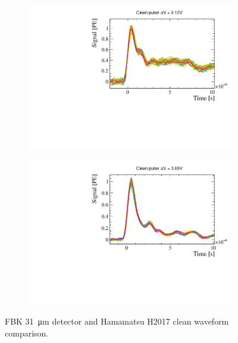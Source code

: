\begin{figure}[htbp]
  \centering

  \begin{subfigure}{0.48\textwidth}
    \includegraphics[width=\textwidth]{gfx/plots/WA/31/clean_10ns.pdf}
    \caption{}
    \label{fig:31/clean_10ns}
  \end{subfigure}
  \hfill
  \begin{subfigure}{0.48\textwidth}
    \includegraphics[width=\textwidth]{gfx/plots/WA/H2017/clean_10ns.pdf}
    \caption{}
    \label{fig:H2017/clean_10ns}
  \end{subfigure}
  \caption{FBK \SI{31}{\micro m} detector  and Hamamatsu H2017  clean waveform comparison.}
  \label{fig:clean waveform comparison}
\end{figure}

